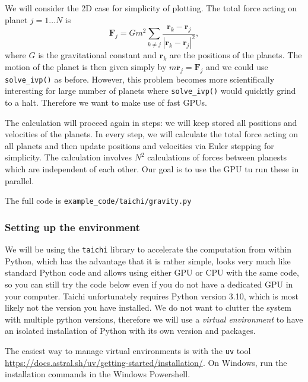 \documentclass{article}
\newcommand{\bv}[1]{\ensuremath{\mathbf{#1}}}
\newcommand{\ls}[1]{\lstinline{#1}}
\begin{document}
We will consider the 2D case for simplicity of plotting. The total force acting on planet $j = 1\dots N$ is
\begin{equation}
    \bv F_j = Gm^2\sum_{k\neq j}\frac{\bv r_k - \bv r_j}{|\bv r_k - \bv r_j|^2},
\end{equation}
where $G$ is the gravitational constant and $\bv r_k$ are the positions of the planets. The motion of the planet is then given simply by $m\ddot{\bv r_j} = \bv F_j$ and we could use \ls{solve_ivp()} as before. However, this problem becomes more scientifically interesting for large number of planets where \ls{solve_ivp()} would quicktly grind to a halt. Therefore we want to make use of fast GPUs.

The calculation will proceed again in steps: we will keep stored all positions and velocities of the planets. In every step, we will calculate the total force acting on all planets and then update positions and velocities via Euler stepping for simplicity. The calculation involves $N^2$ calculations of forces between planests which are independent of each other. Our goal is to use the GPU tu run these in parallel.

The full code is \verb|example_code/taichi/gravity.py|

\subsubsection{Setting up the environment}
We will be using the \ls{taichi} library to accelerate the computation from within Python, which has the advantage that it is rather simple, looks very much like standard Python code and allows using either GPU or CPU with the same code, so you can still try the code below even if you do not have a dedicated GPU in your computer. Taichi unfortunately requires Python version 3.10, which is most likely not the version you have installed. We do not want to clutter the system with multiple python versions, therefore we will use a \emph{virtual environment} to have an isolated installation of Python with its own version and packages.

The easiest way to manage virtual environments is with the \ls{uv} tool \url{https://docs.astral.sh/uv/getting-started/installation/}. On Windows, run the installation commands in the Windows Powershell.
\end{document}
